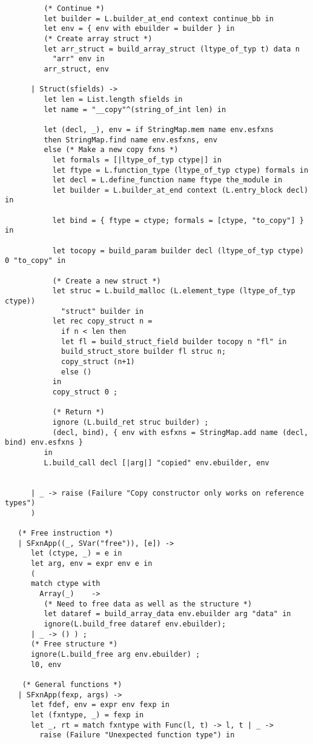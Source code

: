 \documentclass[main.tex]{subfiles}
\begin{document}
\begin{lstlisting}
         (* Continue *)
         let builder = L.builder_at_end context continue_bb in
         let env = { env with ebuilder = builder } in
         (* Create array struct *)
         let arr_struct = build_array_struct (ltype_of_typ t) data n
           "arr" env in
         arr_struct, env
          
      | Struct(sfields) ->
         let len = List.length sfields in
         let name = "__copy"^(string_of_int len) in

         let (decl, _), env = if StringMap.mem name env.esfxns
         then StringMap.find name env.esfxns, env
         else (* Make a new copy fxns *)
           let formals = [|ltype_of_typ ctype|] in
           let ftype = L.function_type (ltype_of_typ ctype) formals in
           let decl = L.define_function name ftype the_module in
           let builder = L.builder_at_end context (L.entry_block decl) in

           let bind = { ftype = ctype; formals = [ctype, "to_copy"] } in

           let tocopy = build_param builder decl (ltype_of_typ ctype) 0 "to_copy" in

           (* Create a new struct *)
           let struc = L.build_malloc (L.element_type (ltype_of_typ ctype))
             "struct" builder in
           let rec copy_struct n =
             if n < len then
             let fl = build_struct_field builder tocopy n "fl" in
             build_struct_store builder fl struc n;
             copy_struct (n+1)
             else ()
           in
           copy_struct 0 ;

           (* Return *)
           ignore (L.build_ret struc builder) ;
           (decl, bind), { env with esfxns = StringMap.add name (decl, bind) env.esfxns }
         in
         L.build_call decl [|arg|] "copied" env.ebuilder, env


      | _ -> raise (Failure "Copy constructor only works on reference types")
      )

   (* Free instruction *)
   | SFxnApp((_, SVar("free")), [e]) ->
      let (ctype, _) = e in
      let arg, env = expr env e in
      (
      match ctype with
        Array(_)    -> 
         (* Need to free data as well as the structure *)
         let dataref = build_array_data env.ebuilder arg "data" in
         ignore(L.build_free dataref env.ebuilder);
      | _ -> () ) ;
      (* Free structure *)
      ignore(L.build_free arg env.ebuilder) ;
      l0, env

    (* General functions *)
   | SFxnApp(fexp, args) ->  
      let fdef, env = expr env fexp in
      let (fxntype, _) = fexp in
      let _, rt = match fxntype with Func(l, t) -> l, t | _ -> 
        raise (Failure "Unexpected function type") in


\end{lstlisting}
\end{document}
